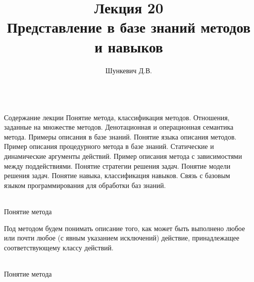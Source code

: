 \title{Лекция 20\\Представление в базе знаний методов и навыков}
\author[]{Шункевич Д.В.}

\begin{frame}
	\titlepage
\end{frame}

\begin{frame}{\\Содержание лекции}
	\topline
	\justifying
	Понятие метода, классификация методов. Отношения, заданные на множестве методов. Денотационная и операционная семантика метода. Примеры описания в базе знаний. Понятие языка описания методов. Пример описания процедурного метода в базе знаний. Статические и динамические аргументы действий. Пример описания метода с зависимостями между поддействиями. Понятие стратегии решения задач. Понятие модели решения задач. Понятие навыка, классификация навыков. Связь с базовым языком программирования для обработки баз знаний.
\end{frame}

\begin{frame}{\\Понятие метода}
	\topline
	\justifying
    
    Под методом будем понимать описание того, как может быть выполнено любое или почти любое (с явным указанием исключений) действие,
    принадлежащее соответствующему классу действий.
    
    \begin{SCn}
    \end{SCn}
\end{frame}

\begin{frame}{\\Понятие метода}
	\topline
	\justifying
    \begin{SCn}
    \end{SCn}
\end{frame}

